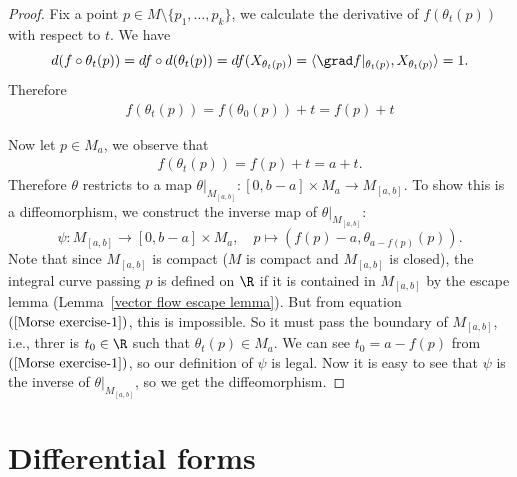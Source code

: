 \begin{proof}
Fix a point $p\in M\setminus\{p_1,\dots,p_k\}$, we calculate the derivative of $f(\theta_t(p))$ with respect to $t$. We have
\[d(f\circ\theta_t(p))=df\circ d(\theta_t(p))=df(X_{\theta_t(p)})=\langle \grad f|_{\theta_t(p)},X_{\theta_t(p)}\rangle=1.\]
Therefore 
\begin{align}\label{Morse exercise-1}
f(\theta_t(p))=f(\theta_0(p))+t=f(p)+t
\end{align}

Now let $p\in M_a$, we observe that
\begin{align*}
f(\theta_t(p))=f(p)+t=a+t.
\end{align*}
Therefore $\theta$ restricts to a map $\theta|_{M_{[a,b]}}:[0,b-a]\times M_a\to M_{[a,b]}$. To show this is a diffeomorphism, we construct the inverse map of $\theta|_{M_{[a,b]}}$:
\[\psi:M_{[a,b]}\to[0,b-a]\times M_a,\quad p\mapsto(f(p)-a,\theta_{a-f(p)}(p)).\]
Note that since $M_{[a,b]}$ is compact ($M$ is compact and $M_{[a,b]}$ is closed), the integral curve passing $p$ is defined on $\R$ if it is contained in $M_{[a,b]}$ by the escape lemma 
(Lemma~\ref{vector flow escape lemma}). But from equation $(\ref{Morse exercise-1})$, this is impossible. So it must pass the boundary of $M_{[a,b]}$, i.e., threr 
is $t_0\in\R$ such that $\theta_t(p)\in M_a$. We can see $t_0=a-f(p)$ from $(\ref{Morse exercise-1})$, so our definition of $\psi$ is legal. Now it is easy to see that 
$\psi$ is the inverse of $\theta|_{M_{[a,b]}}$, so we get the diffeomorphism.
\end{proof}
\section{Differential forms}
